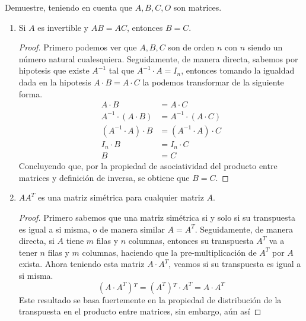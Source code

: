 \item Demuestre, teniendo en cuenta que \(A, B, C, O\) son matrices.
    \begin{enumerate}[label=\listAlph]
        \item Si \(A\) es invertible y \(AB = AC\), entonces \(B = C\).
            \begin{proof}
                Primero podemos ver que \(A, B, C\) son de orden \(n\) con \(n\) siendo un número natural cualesquiera.
                Seguidamente, de manera directa, sabemos por hipotesis que existe \(A^{-1}\) tal que \(A^{-1} \cdot A = I_n\), entonces 
                tomando la igualdad dada en la hipotesis \(A \cdot B = A \cdot C\) la podemos transformar de la siguiente forma.
                \[
                    \begin{aligned}
                        A \cdot B &= A \cdot C \\
                        A^{-1} \cdot (A \cdot B) &= A^{-1} \cdot (A \cdot C) \\
                        \left(A^{-1} \cdot A\right) \cdot B &= \left(A^{-1} \cdot A\right) \cdot C \\
                        I_n \cdot B &= I_n \cdot C \\
                        B &= C
                    \end{aligned}
                \]
                Concluyendo que, por la propiedad de asociatividad del producto entre matrices y definición de inversa, se obtiene que \(B = C\).
            \end{proof}
        \item \(AA^T\) es una matriz simétrica para cualquier matriz \(A\).
            \begin{proof}
                Primero sabemos que una matriz simétrica si y solo si su transpuesta es igual a si misma, o de manera similar \(A = A^T\).
                Seguidamente, de manera directa, si \(A\) tiene \(m\) filas y \(n\) columnas, 
                entonces su transpuesta \(A^T\) va a tener \(n\) filas y \(m\) columnas, 
                haciendo que la pre-multiplicación de \(A^T\) por \(A\) exista. Ahora teniendo esta matriz 
                \(A \cdot A^T\), veamos si su transpuesta es igual a si misma.
                \[
                    \left(A \cdot A^T\right){}^T = \left(A^T\right){}^T \cdot A^T = A \cdot A^T
                \]
                Este resultado se basa fuertemente en la propiedad de distribución de la transpuesta en el producto entre matrices, sin embargo, aún así

\end{proof}
\end{enumerate}
